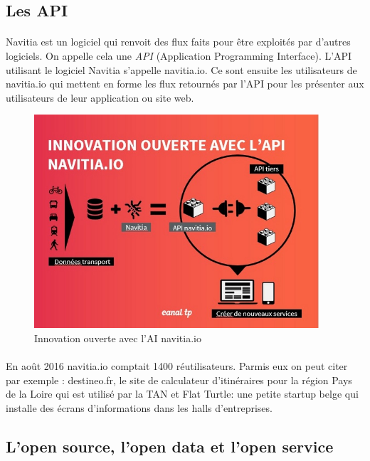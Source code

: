 \documentclass[a4paper]{report}
\begin{document}
\subsection{Les API} 
\paragraph{} Navitia est un logiciel qui renvoit des flux faits pour être exploités par d'autres logiciels. On appelle cela une  \emph{API} (Application Programming Interface). L'API utilisant le logiciel Navitia s'appelle navitia.io. Ce sont ensuite les utilisateurs de navitia.io qui mettent en forme les flux retournés par l'API pour les présenter aux utilisateurs de leur application ou site web. 

\begin{figure}[H] 
	\begin{center}
		\includegraphics[width=300pt]{image/API_navitia}
		\caption{Innovation ouverte avec l'AI navitia.io}
		\label{Innovation ouverte avec l'AI navitia.io}
	\end{center}
\end{figure}

\paragraph{} En août 2016 navitia.io comptait 1400 réutilisateurs. Parmis eux on peut citer par exemple : destineo.fr, le site de calculateur d'itinéraires pour la région Pays de la Loire qui est utilisé par la TAN et Flat Turtle: une petite startup belge qui installe des écrans d’informations dans les halls d’entreprises. 

\subsection{L'open source, l'open data et l'open service}
\end{document}
